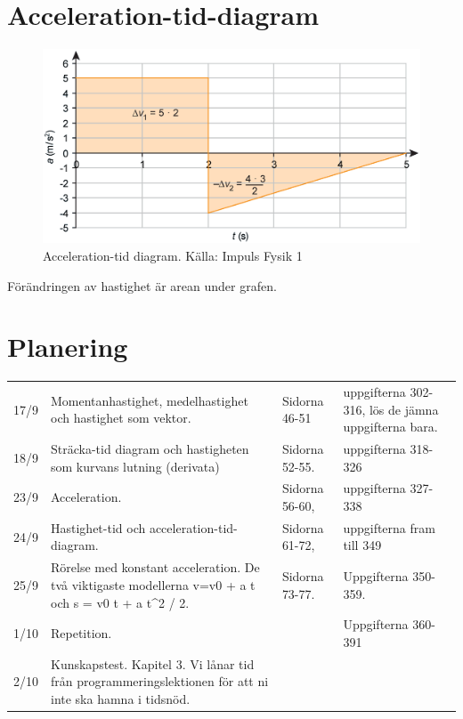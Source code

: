 \documentclass[11pt]{article}
\begin{document}
    \section{Acceleration-tid-diagram}
    \begin{figure}[!h]
        \includegraphics[width=\textwidth]{../images/chapter3/accelerationTime.png}
        \caption{Acceleration-tid diagram. Källa: Impuls Fysik 1}
    \end{figure}
    Förändringen av hastighet är arean under grafen.
    \clearpage
    \section{Planering}
    \begin{table}[h]
        \begin{tabular}{|l|p{6cm}|p{4cm}|l}
            \hline
            17/9 & Momentanhastighet, medelhastighet och hastighet som vektor. & Sidorna 46-51 & uppgifterna 302-316, lös de jämna uppgifterna bara. \\

            18/9 & Sträcka-tid diagram och hastigheten som kurvans lutning (derivata) & Sidorna 52-55. & uppgifterna 318-326 \\

            23/9 & Acceleration. & Sidorna 56-60, &  uppgifterna 327-338 \\

            24/9 & Hastighet-tid och acceleration-tid-diagram. & Sidorna 61-72, & uppgifterna fram till 349 \\

            25/9 & Rörelse med konstant acceleration. De två viktigaste modellerna v=v0 + a t och s = v0
            t + a t^2 / 2.  & Sidorna 73-77. &  Uppgifterna 350-359. \\

            1/10 & Repetition. & & Uppgifterna 360-391 \\

            2/10 & Kunskapstest. Kapitel 3. Vi lånar tid från programmeringslektionen för att ni inte ska hamna i tidsnöd. & & \\

            \hline
        \end{tabular}
    \end{table}
\end{document}
